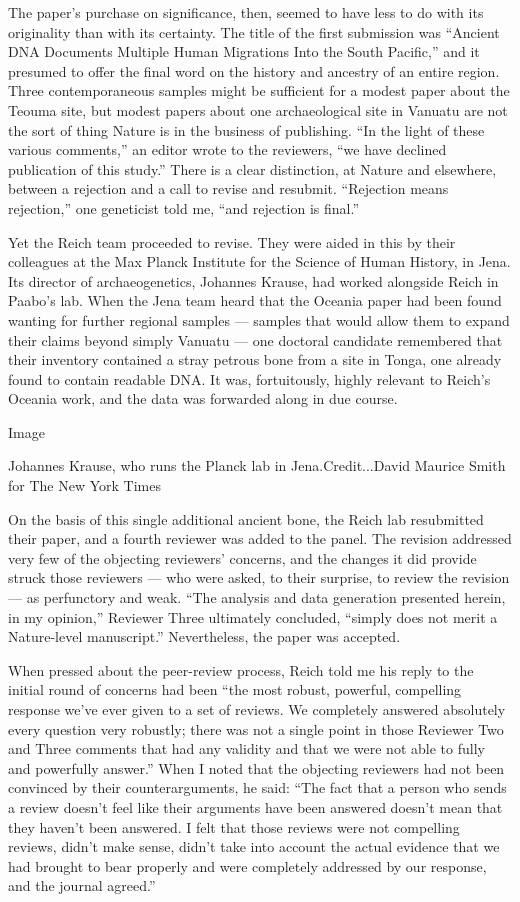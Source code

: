 The paper's purchase on significance, then, seemed to have less to do
with its originality than with its certainty. The title of the first
submission was ``Ancient DNA Documents Multiple Human Migrations Into
the South Pacific,'' and it presumed to offer the final word on the
history and ancestry of an entire region. Three contemporaneous samples
might be sufficient for a modest paper about the Teouma site, but modest
papers about one archaeological site in Vanuatu are not the sort of
thing Nature is in the business of publishing. ``In the light of these
various comments,'' an editor wrote to the reviewers, ``we have declined
publication of this study.'' There is a clear distinction, at Nature and
elsewhere, between a rejection and a call to revise and resubmit.
``Rejection means rejection,'' one geneticist told me, ``and rejection
is final.''

Yet the Reich team proceeded to revise. They were aided in this by their
colleagues at the Max Planck Institute for the Science of Human History,
in Jena. Its director of archaeogenetics, Johannes Krause, had worked
alongside Reich in Paabo's lab. When the Jena team heard that the
Oceania paper had been found wanting for further regional samples ---
samples that would allow them to expand their claims beyond simply
Vanuatu --- one doctoral candidate remembered that their inventory
contained a stray petrous bone from a site in Tonga, one already found
to contain readable DNA. It was, fortuitously, highly relevant to
Reich's Oceania work, and the data was forwarded along in due course.

Image

Johannes Krause, who runs the Planck lab in Jena.Credit...David Maurice
Smith for The New York Times

On the basis of this single additional ancient bone, the Reich lab
resubmitted their paper, and a fourth reviewer was added to the panel.
The revision addressed very few of the objecting reviewers' concerns,
and the changes it did provide struck those reviewers --- who were
asked, to their surprise, to review the revision --- as perfunctory and
weak. ``The analysis and data generation presented herein, in my
opinion,'' Reviewer Three ultimately concluded, ``simply does not merit
a Nature-level manuscript.'' Nevertheless, the paper was accepted.

When pressed about the peer-review process, Reich told me his reply to
the initial round of concerns had been ``the most robust, powerful,
compelling response we've ever given to a set of reviews. We completely
answered absolutely every question very robustly; there was not a single
point in those Reviewer Two and Three comments that had any validity and
that we were not able to fully and powerfully answer.'' When I noted
that the objecting reviewers had not been convinced by their
counterarguments, he said: ``The fact that a person who sends a review
doesn't feel like their arguments have been answered doesn't mean that
they haven't been answered. I felt that those reviews were not
compelling reviews, didn't make sense, didn't take into account the
actual evidence that we had brought to bear properly and were completely
addressed by our response, and the journal agreed.''

